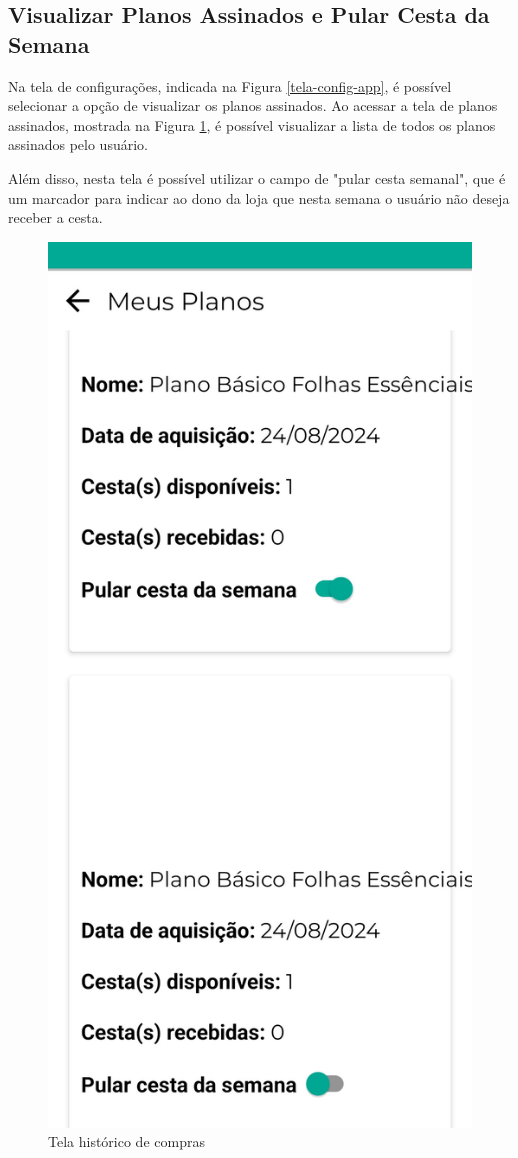 \subsection{Visualizar Planos Assinados e Pular Cesta da Semana}
Na tela de configurações, indicada na Figura \ref{tela-config-app}, é possível selecionar a opção de visualizar os planos assinados. Ao acessar a tela de planos assinados, mostrada na Figura \ref{tela-planos-assinados-app}, é possível visualizar a lista de todos os planos assinados pelo usuário.

Além disso, nesta tela é possível utilizar o campo de "pular cesta semanal", que é um marcador para indicar ao dono da loja que nesta semana o usuário não deseja receber a cesta.

\begin{figure}[h]
	\centering
	\includegraphics[keepaspectratio=true,scale=0.16]{figuras/planos_assinados.jpg}
	\caption{Tela histórico de compras}
        \label{tela-planos-assinados-app}
\end{figure}